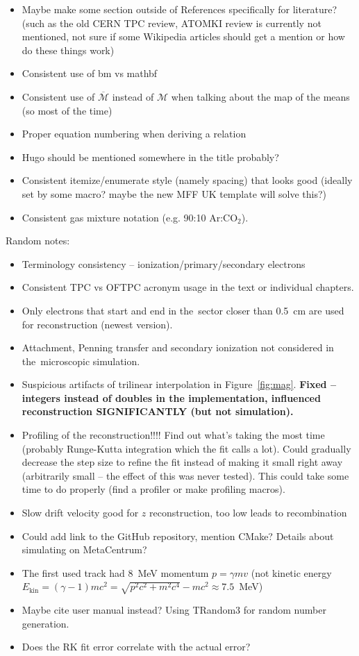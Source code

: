 {\begin{itemize}[topsep=4pt,itemsep=2pt]
				\item Maybe make some section outside of References specifically for literature? (such as the old CERN TPC review, ATOMKI review is currently not mentioned, not sure if some Wikipedia articles should get a mention or how do these things work)
				\item Consistent use of bm vs mathbf
				\item Consistent use of $\overbar{\mathcal{M}}$ instead of $\mathcal{M}$ when talking about the map of the means (so most of the time)
				\item Proper equation numbering when deriving a relation
				\item Hugo should be mentioned somewhere in the title probably?
				\item Consistent itemize/enumerate style (namely spacing) that looks good (ideally set by some macro? maybe the new MFF UK template will solve this?)
				\item Consistent gas mixture notation (e.g.  90:10 Ar:CO$_2$).
			\end{itemize}
		Random notes:
			\begin{itemize}[topsep=4pt,itemsep=2pt]
				\item Terminology consistency -- ionization/primary/secondary electrons
				\item Consistent \ac{TPC} vs \ac{OFTPC} acronym usage in the text or individual chapters.
				\item Only electrons that start and end in the~sector closer than 0.5~cm are used for reconstruction (newest version).
				\item Attachment, Penning transfer and secondary ionization not considered in the~microscopic simulation.
				\item Suspicious artifacts of trilinear interpolation in Figure~\ref{fig:mag}. \textbf{Fixed -- integers instead of doubles in the implementation, influenced reconstruction SIGNIFICANTLY (but not simulation).}
				\item Profiling of the reconstruction!!!! Find out what's taking the most time (probably Runge-Kutta integration which the fit calls a lot). Could gradually decrease the step size to refine the fit instead of making it small right away (arbitrarily small -- the effect of this was never tested). This could take some time to do properly (find a profiler or make profiling macros).
				\item Slow drift velocity good for $z$ reconstruction, too low leads to recombination
				\item Could add link to the GitHub repository, mention CMake? Details about simulating on MetaCentrum?
				\item The first used track had 8~MeV momentum $p = \gamma m v$ (not kinetic energy $E_\text{kin} = (\gamma-1) m c^2 = \sqrt{p^2c^2+m^2c^4}-mc^2 \approx 7.5$~MeV)
				\item Maybe cite \garfieldpp user manual instead? Using TRandom3 for random number generation.
				\item Does the RK fit error correlate with the actual error?
			\end{itemize}
		}
